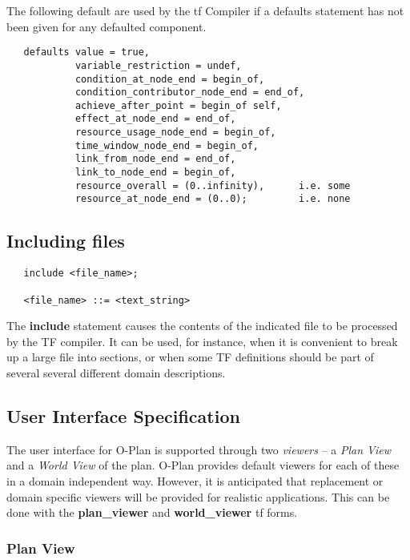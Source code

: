 The following default are used by the {\sc tf} Compiler if a defaults
statement has not been given for any defaulted component.

\begin{verbatim}
   defaults value = true,
            variable_restriction = undef,
            condition_at_node_end = begin_of,
            condition_contributor_node_end = end_of,
            achieve_after_point = begin_of self,
            effect_at_node_end = end_of,
            resource_usage_node_end = begin_of,
            time_window_node_end = begin_of,
            link_from_node_end = end_of,
            link_to_node_end = begin_of,
            resource_overall = (0..infinity),      i.e. some
            resource_at_node_end = (0..0);         i.e. none
\end{verbatim}


\subsection{Including files}

\begin{verbatim}
   include <file_name>;

   <file_name> ::= <text_string>
\end{verbatim}

The {\bf include} statement causes the contents of the indicated file
to be processed by the TF compiler.  It can be used, for instance, when
it is convenient to break up a large file into sections, or when some
TF definitions should be part of several several different domain
descriptions.


\subsection{User Interface Specification}

The user interface for O-Plan is supported through two {\em viewers} --
a {\em Plan View} and a {\em World View} of the plan.  O-Plan provides
default viewers for each of these in a domain independent way.  However,
it is anticipated that replacement or domain specific viewers will be provided
for realistic applications.  This can be done with the {\bf plan\_viewer} and
{\bf world\_viewer} {\sc tf} forms.

\subsubsection{Plan View}

